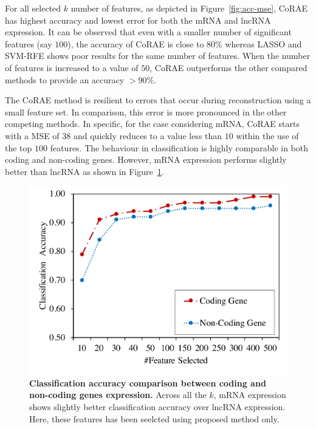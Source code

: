 \documentclass{bioinfo}
\begin{document}
For all selected $k$ number of features, as depicted in Figure~\ref{fig:acc-mse}, CoRAE has highest accuracy and lowest error for both the mRNA and lncRNA expression.
It can be observed that even with a smaller number of significant features (say $100$), the accuracy of CoRAE is close to 80\% whereas LASSO and SVM-RFE shows poor results for the same number of features.
When the number of features is increased to a value of $50$, CoRAE outperforms the other compared methods to provide an accuracy $> 90\%$.

The CoRAE method is resilient to errors that occur during reconstruction using a small feature set. In comparison, this error is more pronounced in the other competing methods.
In specific, for the case considering mRNA, CoRAE starts with a MSE of $38$ and quickly reduces to a value less than $10$ within the use of the top $100$ features. 
The behaviour in classification is highly comparable in both coding and non-coding genes.
However, mRNA expression performs slightly better than lncRNA as shown in Figure~\ref{fig:acc-mRNA-lncRNA}.
 
\begin{figure}[hbt]
    \centering
    \includegraphics[scale=0.45]{fig/acc-mRNA-lncRNA.pdf}
    \caption{\textbf{Classification accuracy comparison between coding and non-coding genes expression.} Across all the $k$, mRNA expression shows slightly better classification accuracy over lncRNA expression. Here, these features has been seelcted using proposed method only.}
    \label{fig:acc-mRNA-lncRNA}
\end{figure}
\end{document}

